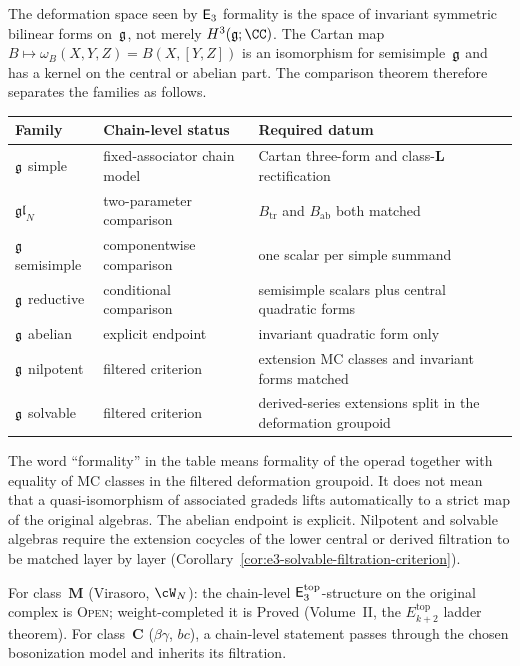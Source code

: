 \begin{remark}
\label{rem:e3-id-family-enumeration}
The deformation space seen by $\mathsf{E}_3$ formality is the space of
invariant symmetric bilinear forms on~$\mathfrak{g}$, not merely
$H^3(\fg;\CC)$. The Cartan map
$B\mapsto \omega_B(X,Y,Z)=B(X,[Y,Z])$ is an isomorphism for
semisimple~$\mathfrak{g}$ and has a kernel on the central or abelian part.
The comparison theorem therefore separates the families as follows.

\begin{center}
\renewcommand{\arraystretch}{1.2}
\small
\begin{tabular}{@{}lll@{}}
\toprule
Family & Chain-level status & Required datum \\
\midrule
$\mathfrak{g}$ simple
 & fixed-associator chain model
 & Cartan three-form and class-$\mathbf L$ rectification \\
$\mathfrak{gl}_N$
 & two-parameter comparison
 & $B_{\mathrm{tr}}$ and $B_{\mathrm{ab}}$ both matched \\
$\mathfrak{g}$ semisimple
 & componentwise comparison
 & one scalar per simple summand \\
$\mathfrak{g}$ reductive
 & conditional comparison
 & semisimple scalars plus central quadratic forms \\
$\mathfrak{g}$ abelian
 & explicit endpoint
 & invariant quadratic form only \\
$\mathfrak{g}$ nilpotent
 & filtered criterion
 & extension MC classes and invariant forms matched \\
$\mathfrak{g}$ solvable
 & filtered criterion
 & derived-series extensions split in the deformation groupoid
\end{tabular}
\end{center}

The word ``formality'' in the table means formality of the operad
together with equality of MC classes in the filtered deformation
groupoid. It does not mean that a quasi-isomorphism of associated
gradeds lifts automatically to a strict map of the original
algebras. The abelian endpoint is explicit. Nilpotent and solvable
algebras require the extension cocycles of the lower central or
derived filtration to be matched layer by layer
(Corollary~\ref{cor:e3-solvable-filtration-criterion}).

For class~$\mathbf{M}$ (Virasoro, $\cW_N$): the chain-level
$\mathsf{E}_3^{\mathrm{top}}$-structure on the original complex is
\textsc{Open}; weight-completed it is \textup{Proved}
(Volume~II, the $E_{k+2}^{\mathrm{top}}$ ladder theorem). For
class~$\mathbf{C}$ ($\beta\gamma$, $bc$), a chain-level statement
passes through the chosen bosonization model and inherits its
filtration.
\end{remark}


